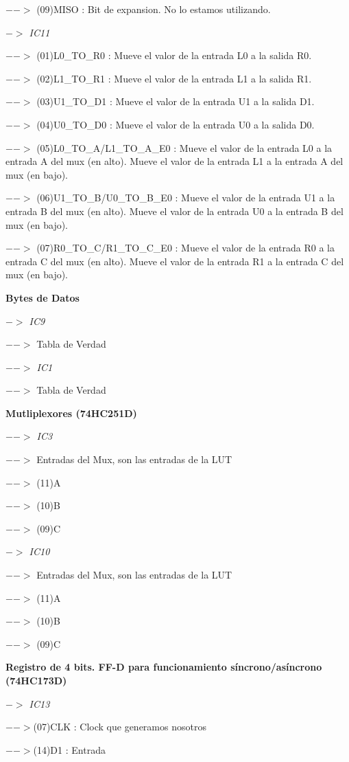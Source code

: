 \documentclass[12pt]{article}
\begin{document}
	$-->$	(09)MISO	:	Bit de expansion. No lo estamos utilizando.
	
\textit{$->$	IC11}
	
	$-->$	(01)L0\_TO\_R0	:	Mueve el valor de la entrada L0 a la salida R0.
	
	$-->$	(02)L1\_TO\_R1	:	Mueve el valor de la entrada L1 a la salida R1.
	
	$-->$	(03)U1\_TO\_D1	:	Mueve el valor de la entrada U1 a la salida D1.
	
	$-->$	(04)U0\_TO\_D0	:	Mueve el valor de la entrada U0 a la salida D0.
	
	$-->$	(05)L0\_TO\_A/L1\_TO\_A\_E0	:	Mueve el valor de la entrada L0 a la entrada A del mux (en alto). Mueve el valor de la entrada L1 a la entrada A del mux (en bajo).
	
	$-->$	(06)U1\_TO\_B/U0\_TO\_B\_E0	:	Mueve el valor de la entrada U1 a la entrada B del mux (en alto). Mueve el valor de la entrada U0 a la entrada B del mux (en bajo).
	
	$-->$	(07)R0\_TO\_C/R1\_TO\_C\_E0	:	Mueve el valor de la entrada R0 a la entrada C del mux (en alto). Mueve el valor de la entrada R1 a la entrada C del mux (en bajo).
	
\textbf{Bytes de Datos}

\textit{$->$	IC9}

	$-->$	Tabla de Verdad
	
\textit{$-->$	IC1}

	$-->$	Tabla de Verdad
	
\textbf{Mutliplexores	(74HC251D)}

\textit{$-->$	IC3}

	$-->$	Entradas del Mux, son las entradas de la LUT
	
	$-->$	(11)A
	
	$-->$	(10)B
	
	$-->$	(09)C
	
\textit{$->$	IC10}

	$-->$	Entradas del Mux, son las entradas de la LUT
	
	$-->$	(11)A
	
	$-->$	(10)B
	
	$-->$	(09)C
	
\textbf{Registro de 4 bits. FF-D para funcionamiento síncrono/asíncrono	(74HC173D)}

\textit{$->$	IC13}

	$-->$(07)CLK	:	Clock que generamos nosotros
	
	$-->$(14)D1	:	Entrada
	
\end{document}
